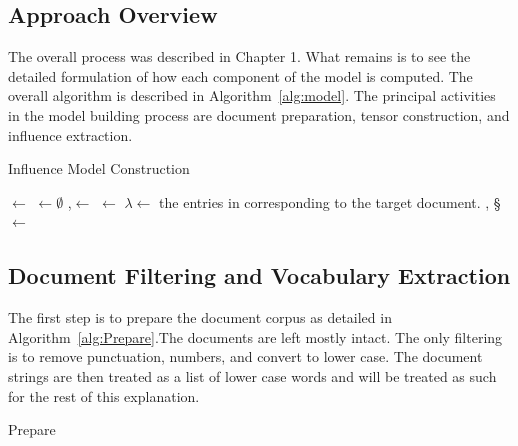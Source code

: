 \documentclass[../ut-dissertation.tex]{subfiles}
\begin{document}
\subsection{Approach Overview}
The overall process was described in Chapter 1.  What remains is to
see the detailed formulation of how each component of the model is
computed.  The overall algorithm is described in
Algorithm~\ref{alg:model}.  The principal activities in the model
building process are document preparation, tensor construction, and
influence extraction.  
\begin{algorithm}
  \caption{Influence Model Construction}
  \label{alg:model}

   
   
   
  
  \Output{\W, \S, \F}
  \BlankLine
  \;
  \V $\leftarrow$ \;
  \C $\leftarrow\emptyset$\;
  \LN,\F $\leftarrow$ \;
  \DM $\leftarrow$ \DistanceMatrix{\F}\;
  $\lambda \leftarrow$ the entries in \LN corresponding to the target document.\;
  \W, \S $\leftarrow$ \;
  \Return{\W, \S, \F}\;
\end{algorithm}

\subsection{Document Filtering and Vocabulary Extraction}
The first step is to prepare the document corpus as detailed in
Algorithm~\ref{alg:Prepare}.The documents are
left mostly intact.  The only filtering is to remove punctuation,
numbers, and convert to lower case.  The document strings are then
treated as a list of lower case words and will be treated as such for
the rest of this explanation.

\begin{algorithm}
  \caption{Prepare}
  \label{alg:Prepare}
  \BlankLine
\end{algorithm}
\end{document}
